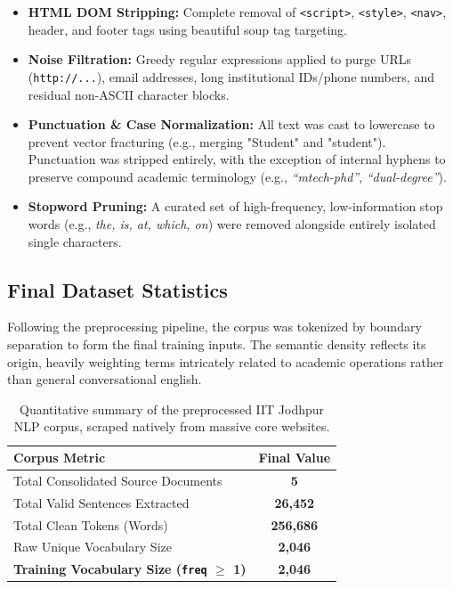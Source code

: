 \documentclass[11pt,a4paper]{article}
\begin{document}
\begin{itemize}[label=\textcolor{iitjgold}{\textbullet}, itemsep=0.5em]
    \justifying
    \item \textbf{HTML DOM Stripping:} Complete removal of \texttt{<script>}, \texttt{<style>}, \texttt{<nav>}, header, and footer tags using beautiful soup tag targeting.
    \item \textbf{Noise Filtration:} Greedy regular expressions applied to purge URLs (\texttt{http://...}), email addresses, long institutional IDs/phone numbers, and residual non-ASCII character blocks.
    \item \textbf{Punctuation \& Case Normalization:} All text was cast to lowercase to prevent vector fracturing (e.g., merging "Student" and "student"). Punctuation was stripped entirely, with the exception of internal hyphens to preserve compound academic terminology (e.g., \textit{``mtech-phd''}, \textit{``dual-degree''}).
    \item \textbf{Stopword Pruning:} A curated set of high-frequency, low-information stop words (e.g., \textit{the, is, at, which, on}) were removed alongside entirely isolated single characters.
\end{itemize}

\subsection{Final Dataset Statistics}
Following the preprocessing pipeline, the corpus was tokenized by boundary separation to form the final training inputs. The semantic density reflects its origin, heavily weighting terms intricately related to academic operations rather than general conversational english.

\begin{table}[H]
    \centering
    \renewcommand{\arraystretch}{1.3}
    \begin{tabular}{@{} l c @{}}
        \toprule
        \textbf{\color{iitjblue} Corpus Metric} & \textbf{\color{iitjblue} Final Value} \\
        \midrule
        Total Consolidated Source Documents & \textbf{5} \\
        Total Valid Sentences Extracted & \textbf{26,452} \\
        Total Clean Tokens (Words) & \textbf{256,686} \\
        Raw Unique Vocabulary Size & \textbf{2,046} \\
        \rowcolor{highlightbg}
        \textbf{Training Vocabulary Size (\texttt{freq} $\boldsymbol{\ge}$ \textbf{1})} & \textbf{2,046} \\
        \bottomrule
    \end{tabular}
    \vspace{0.5em}
    \caption{Quantitative summary of the preprocessed IIT Jodhpur NLP corpus, scraped natively from massive core websites.}
\end{table}
\end{document}
